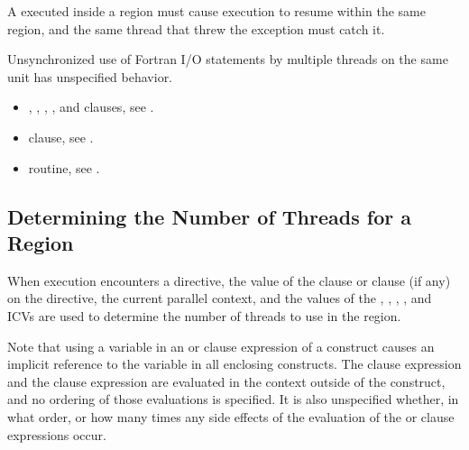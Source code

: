 \ccppspecificstart
A  executed inside a  region must cause execution to resume 
within the same  region, and the same thread that threw the exception 
must catch it.
\ccppspecificend

\fortranspecificstart
Unsynchronized use of Fortran I/O statements by multiple threads on the same unit 
has unspecified behavior.
\fortranspecificend

\crossreferences
\begin{itemize}
\item {}, , , , and  clauses, see 
.

\item {} clause, see 
.

\item {} routine, see 
.
\end{itemize}











\subsection{Determining the Number of Threads for a  Region}
\label{subsec:Determining the Number of Threads for a parallel Region}
When execution encounters a  directive, the value of the  clause or 
 clause (if any) on the directive, the current parallel context, and the 
values of the , , , 
, and  
ICVs are used to determine the number of threads to use in the region.

Note that using a variable in an  or  clause expression of a 
 construct causes an implicit reference to the variable in all enclosing 
constructs. The  clause expression and the  clause expression are 
evaluated in the context outside of the  construct, and no ordering of those 
evaluations is specified. It is also unspecified whether, in what order, or how many times 
any side effects of the evaluation of the  or  clause expressions occur.

